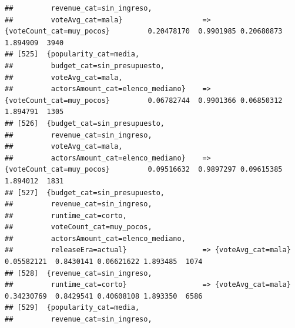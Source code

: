 \documentclass[
]{article}
\begin{document}
\begin{verbatim}
##         revenue_cat=sin_ingreso,                                                                                                
##         voteAvg_cat=mala}                   => {voteCount_cat=muy_pocos}         0.20478170  0.9901985 0.20680873 1.894909  3940
## [525]  {popularity_cat=media,                                                                                                   
##         budget_cat=sin_presupuesto,                                                                                             
##         voteAvg_cat=mala,                                                                                                       
##         actorsAmount_cat=elenco_mediano}    => {voteCount_cat=muy_pocos}         0.06782744  0.9901366 0.06850312 1.894791  1305
## [526]  {budget_cat=sin_presupuesto,                                                                                             
##         revenue_cat=sin_ingreso,                                                                                                
##         voteAvg_cat=mala,                                                                                                       
##         actorsAmount_cat=elenco_mediano}    => {voteCount_cat=muy_pocos}         0.09516632  0.9897297 0.09615385 1.894012  1831
## [527]  {budget_cat=sin_presupuesto,                                                                                             
##         revenue_cat=sin_ingreso,                                                                                                
##         runtime_cat=corto,                                                                                                      
##         voteCount_cat=muy_pocos,                                                                                                
##         actorsAmount_cat=elenco_mediano,                                                                                        
##         releaseEra=actual}                  => {voteAvg_cat=mala}                0.05582121  0.8430141 0.06621622 1.893485  1074
## [528]  {revenue_cat=sin_ingreso,                                                                                                
##         runtime_cat=corto}                  => {voteAvg_cat=mala}                0.34230769  0.8429541 0.40608108 1.893350  6586
## [529]  {popularity_cat=media,                                                                                                   
##         revenue_cat=sin_ingreso,                                                                                                

\end{verbatim}
\end{document}
